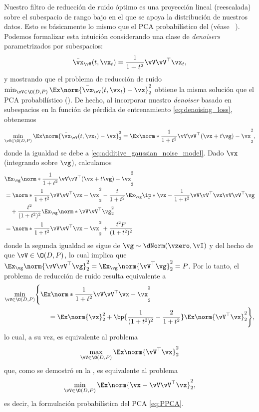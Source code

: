 \documentclass[../../book-main.tex]{subfiles}
\begin{document}
Nuestro filtro de reducción de ruido óptimo es una proyección lineal (reescalada) sobre el
subespacio de rango bajo en el que se apoya la distribución de nuestros datos. Esto es
básicamente lo mismo que el PCA probabilístico del
 (véase ~). Podemos
formalizar esta intuición considerando una clase de
\textit{denoisers} parametrizados por subespacios:
\begin{equation}\label{eq:optimal nn}
    \bar{\vx}_{\vV}(t, \vx_{t}) = \frac{1}{1 + t^{2}}\vV\vV^{\top}\vx_{t},
\end{equation}
y mostrando que el problema de reducción de ruido \(\min_{\vV \in \O(D,
    P)}\Ex\norm{\bar{\vx}_{\vV}(t, \vx_{t}) -
\vx}_{2}^{2}\) obtiene la misma solución que el PCA probabilístico
(). De hecho, al incorporar nuestro \textit{denoiser} basado en subespacios
en la función de pérdida de entrenamiento \eqref{eq:denoising_loss}, obtenemos
\begin{equation}
    \min_{\vV \in \O(D, P)}\Ex\norm{\bar{\vx}_{\vV}(t,
    \vx_{t}) - \vx}_{2}^{2} = \Ex\norm*{\frac{1}{1 +
    t^{2}}\vV\vV^{\top}(\vx + t\vg) - \vx}_{2}^{2},
\end{equation}
donde la igualdad se debe a
\eqref{eq:additive_gaussian_noise_model}. Dado \(\vx\)
(integrando sobre \(\vg\)), calculamos
\begin{align}
    & \Ex_{\vg}\norm*{\frac{1}{1 + t^{2}}\vV\vV^{\top}(\vx + t\vg) -
    \vx}_{2}^{2} \\
    &= \norm*{\frac{1}{1 + t^{2}}\vV\vV^{\top}\vx - \vx}_{2}^{2} -
    \frac{t}{1+t^2}\Ex_{\vg} \ip*{\vx - \frac{1}{1 +
    t^{2}}\vV\vV^{\top}\vx}{\vV\vV^{\top}\vg} \\
    &\quad + \frac{t^2}{(1+t^2)^2} \Ex_{\vg}\norm*{\vV\vV^{\top} \vg}_{2}^{2} \\
    &= \norm*{\frac{1}{1 + t^{2}}\vV\vV^{\top}\vx - \vx}_{2}^{2} +
    \frac{t^2P}{(1+t^2)^2}
\end{align}
donde la segunda igualdad se sigue de \(\vg \sim \dNorm(\vzero,
\vI)\) y del hecho de que \(\vV \in \O(D, P)\), lo cual implica que \(
    \Ex_{\vg}\norm{\vV\vV^\top
    \vg}_{2}^{2} =
\Ex_{\vg}\norm{\vV^\top \vg}_{2}^{2} = P\). Por lo tanto, el problema de reducción de ruido
resulta equivalente a
\begin{align}
    \min_{\vV \in \O(D, P)} & \Bigg\{\Ex \norm*{\frac{1}{1 +
        t^{2}}\vV\vV^{\top}\vx - \vx}_{2}^{2} \\
        & \qquad = \Ex\norm{\vx}_{2}^{2} + \bp{\frac{1}{(1 +
            t^{2})^{2}} - \frac{2}{1 +
    t^{2}}}\Ex\norm{\vV^{\top}\vx}_{2}^{2}\Bigg\},
\end{align}
lo cual, a su vez, es equivalente al problema
\begin{equation}\label{eq:PCA}
    \max_{\vV \in \O(D, P)}\Ex\norm{\vV^{\top}\vx}_{2}^{2}
\end{equation}
que, como se demostró en la , es equivalente al problema
\begin{equation}
    \min_{\vV \in \O(D, P)}\Ex\norm{\vx - \vV\vV^{\top}\vx}_{2}^{2},
\end{equation}
es decir, la formulación probabilística del PCA \eqref{eq:PPCA}.
\end{document}
